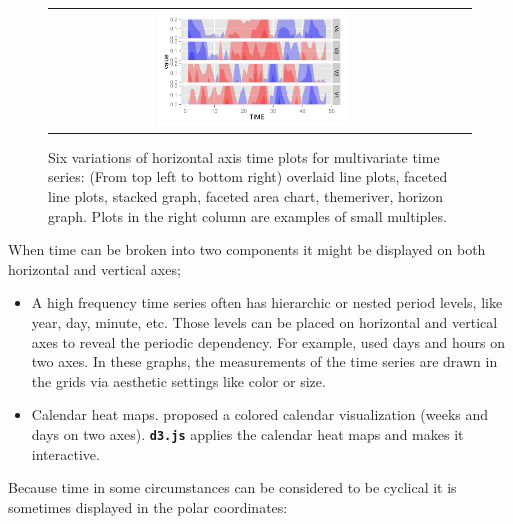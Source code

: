 \documentclass[12pt]{article}
\begin{document}
\begin{itemize}
\begin{center}
\begin{figure}[htp]
\begin{centering}
\begin{tabular}{cc}
\includegraphics[width=0.48\textwidth]{graph/pipeline-02-horizon}
\end{tabular}
\end{centering}
\caption{\label{fig:horizontal-axis} Six variations of horizontal axis time plots for multivariate
time series: (From top left to bottom right) overlaid line plots, faceted line plots,  stacked graph, faceted area chart, themeriver, horizon graph. Plots in the right column are examples of small multiples. }
\end{figure}
\end{center}

\end{itemize}

When time can be broken into two components it might be displayed on both horizontal and vertical axes;

\begin{itemize} \itemsep 0in
\item A high frequency time series often has hierarchic or nested
period levels, like year, day, minute, etc. Those levels can
be placed on horizontal and vertical axes to reveal the periodic
dependency. For example, \citet{keller1993visual} used days
and hours on two axes. In these graphs, the measurements of
the time series are drawn in the grids via aesthetic settings
like color or size.

\item Calendar heat maps. \citet{van1999cluster} proposed a
colored calendar visualization  (weeks and days on two axes).
\texttt{\textbf{d3.js}} \citep{bostock2011d3} applies the calendar
heat maps and makes it interactive.
\end{itemize}

Because time in some circumstances can be considered to be cyclical it is sometimes displayed in the polar coordinates:

 
\end{document}
